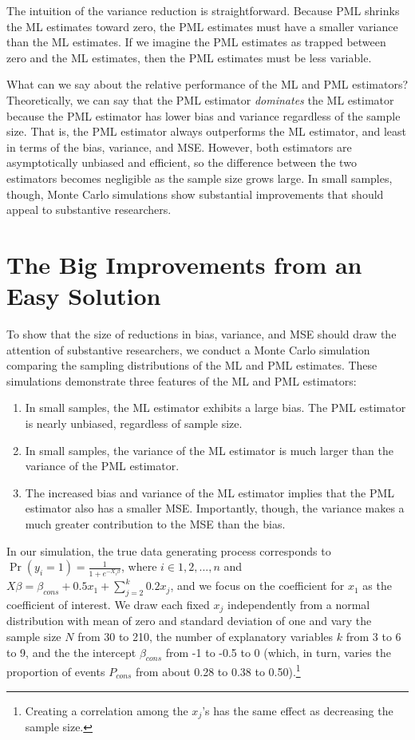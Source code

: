 \documentclass[12pt]{article}
\begin{document}
The intuition of the variance reduction is straightforward. Because PML shrinks the ML estimates toward zero, the PML estimates must have a smaller variance than the ML estimates. If we imagine the PML estimates as trapped between zero and the ML estimates, then the PML estimates must be less variable.

What can we say about the relative performance of the ML and PML estimators? 
Theoretically, we can say that the PML estimator \textit{dominates} the ML estimator because the PML estimator has lower bias and variance regardless of the sample size. That is, the PML estimator always outperforms the ML estimator, and least in terms of the bias, variance, and MSE.
However, both estimators are asymptotically unbiased and efficient, so the difference between the two estimators becomes negligible as the sample size grows large.
In small samples, though, Monte Carlo simulations show substantial improvements that should appeal to substantive researchers.

\section*{The Big Improvements from an Easy Solution}

To show that the size of reductions in bias, variance, and MSE should draw the attention of substantive researchers, we conduct a Monte Carlo simulation comparing the sampling distributions of the ML and PML estimates.
These simulations demonstrate three features of the ML and PML estimators:
\begin{enumerate}
\item In small samples, the ML estimator exhibits a large bias. The PML estimator is nearly unbiased, regardless of sample size.
\item In small samples, the variance of the ML estimator is much larger than the variance of the PML estimator.
\item The increased bias and variance of the ML estimator implies that the PML estimator also has a smaller MSE. Importantly, though, the variance makes a much greater contribution to the MSE than the bias.
\end{enumerate}

In our simulation, the true data generating process corresponds to $\Pr(y_i = 1) = \frac{1}{1 + e^{-X_i \beta}}$, where $i \in 1, 2,..., n$ and $X \beta = \beta_{cons} + 0.5 x_1 + \sum_{j = 2}^k 0.2 x_j$, and we focus on the coefficient for $x_1$ as the coefficient of interest.
We draw each fixed $x_j$ independently from a normal distribution with mean of zero and standard deviation of one and vary the sample size $N$ from 30 to 210, the number of explanatory variables $k$ from 3 to 6 to 9, and the the intercept $\beta_{cons}$ from -1 to -0.5 to 0 (which, in turn, varies the proportion of events $P_{cons}$ from about 0.28 to 0.38 to 0.50).\footnote{Creating a correlation among the $x_j$'s has the same effect as decreasing the sample size.}
\end{document}
